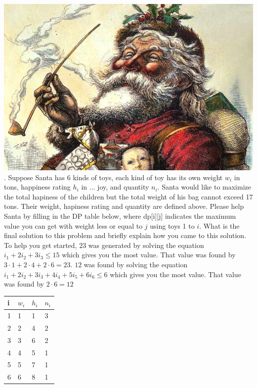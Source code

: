 \documentclass[12pt]{article}
\begin{document}
\noindent\includegraphics[scale = .3]{santa.jpg}\\
. Suppose Santa has 6 kinds of toys, each kind of toy has its own weight $w_i$ in tons, happiness rating $h_i$ in ... joy, and quantity $n_i$. Santa would like to maximize the total hapiness of the children but the total weight of his bag cannot exceed 17 tons. Their weight, hapiness rating and quantity are defined above. Please help Santa by filling in the DP table below, where dp[i][j] indicates the maximum value you can get with weight less or equal to $j$ using toys 1 to $i$. What is the final solution to this problem and briefly explain how you came to this solution. To help you get started, $23$ was generated by solving the equation $i_1+2i_2+3i_3 \leq 15$ which gives you the most value. That value was found by $3\cdot 1+ 2 \cdot 4 + 2 \cdot 6 = 23$. $12$ was found by solving the equation $i_1+2i_2+3i_3+4i_4+5i_5+6i_6 \leq 6$ which gives you the most value. That value was found by $2\cdot 6 = 12$ 
\begin{table}[]
\begin{tabular}{|l|l|l|l|}
\hline
i & $w_i$ & $h_i$ & $n_i$ \\ \hline
1 & 1    & 1    & 3    \\ \hline
2 & 2    & 4    & 2    \\ \hline
3 & 3    & 6    & 2    \\ \hline
4 & 4    & 5    & 1    \\ \hline
5 & 5    & 7    & 1    \\ \hline
6 & 6    & 8    & 1    \\ \hline
\end{tabular}
\end{table}
\end{document}
